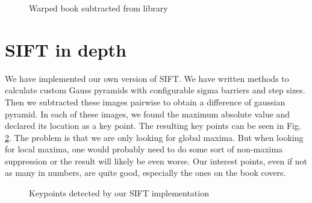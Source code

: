 \documentclass[11pt,a4paper]{article}
\begin{document}
\begin{figure}
\quad
{}
\quad
\caption{Warped book subtracted from library}%
\label{fig:e2}%
\end{figure}

\section{SIFT in depth}
We have implemented our own version of SIFT. We have written methods to calculate custom Gauss pyramids with configurable sigma barriers and step sizes.
Then we subtracted these images pairwise to obtain a difference of gaussian pyramid.
In each of these images, we found the maximum absolute value and declared its location as a key point. The resulting key points can be seen in Fig. \ref{fig:e3}.
The problem is that we are only looking for global maxima. But when looking for local maxima, one would probably need to do some sort of non-maxima suppression or the result
will likely be even worse. Our interest points, even if not as many in numbers, are quite good, especially the ones on the book covers.

\begin{figure}%
\caption{Keypoints detected by our SIFT implementation}%
\label{fig:e3}%
\end{figure}
\end{document}
